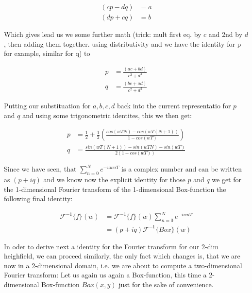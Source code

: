 \begin{align}
(cp-dq)& =a\\
(dp + cq)& =b
\end{align}

Which gives lead us we some further math (trick: mult first eq. by $c$ and 2nd by $d$, then adding them together. using distributivity and we have the identity for p for example, similar for q) to 

\begin{align}
p& =\frac{(ac+bd)}{c^2 + d^2}\\
q& =\frac{(bc+ad)}{c^2 + d^2}
\end{align}


Putting our substituation for $a, b, c, d$ back into the current representatio for $p$ and $q$ and using some trigonometric identites, this we then get:

\begin{align}
p& =\frac{1}{2}+\frac{1}{2}\left(\frac{cos(wTN)-cos(wT(N+1))}{1-cos(wT)}\right)\\
q& =\frac{sin(wT(N+1))-sin(wTN)-sin(wT)}{2(1-cos(wT))}
\end{align}

Since we have seen, that $\sum_{n=0}^N e^{-uwnT}$ is a complex number and can be written as $(p+iq)$ and we know now the explicit identity for those $p$ and $q$ we get for the 1-dimensional Fourier transform of the 1-dimensional Box-function the following final identity:

\begin{align*}
\mathcal{F}^{-1}\{f\}(w)
& =\mathcal{F}^{-1}\{f\}(w) \sum_{n=0}^{N} e^{-iwnT} \\
& = (p+iq) \mathcal{F}^{-1}\{Box\}(w)  
\end{align*}

In oder to derive next a identity for the Fourier transform for our 2-dim heighfield, we can proceed similarly, the only fact which changes is, that we are now in a 2-dimensional domain, i.e. we are about to compute a two-dimensional Fourier transform:
Let us again us again a Box-function, this time a 2-dimensional Box-function $Box(x,y)$ just for the sake of convenience.

